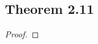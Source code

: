 \documentclass[../../main.tex]{subfiles}
\begin{document}
\subsection{Theorem 2.11}
\begin{wts}

\end{wts}
\begin{proof}

\end{proof}
\end{document}
